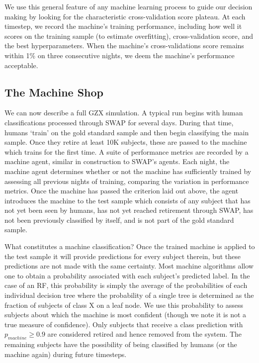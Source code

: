 \documentclass[twocolumn]{aastex6}
\begin{document}
We use this general feature of any machine learning process to guide our 
decision making by looking for the characteristic 
cross-validation score plateau. At each timestep, we record
the machine's training performance, including how well it scores on the 
training sample (to estimate overfitting), cross-validation score, 
and the best hyperparameters. When the machine's 
cross-validations score remains within 1\% on three consecutive nights, 
we deem the machine's performance acceptable. 


\subsection{The Machine Shop}\label{sec: machine shop}
We can now describe a full GZX simulation. A typical run begins with human classifications 
processed through SWAP for several days. During that time, humans `train' on the 
gold standard sample and then begin classifying the main sample.  Once they retire 
at least 10K subjects, these are passed to the machine which trains for the first time. 
A suite of performance metrics are recorded by a machine agent, similar
in construction to SWAP's agents. Each night, the machine agent determines 
whether or not the machine has sufficiently trained by assessing all previous nights of 
training, comparing the variation in performance metrics. Once the machine has
passed the criterion laid out above, the agent introduces the machine to the test sample
which consists of any subject that has not yet been seen by humans, has not yet 
reached retirement through SWAP, has not been previously classified by itself, 
and is not part of the gold standard sample.  

What constitutes a machine classification? Once the trained machine is applied to
the test sample it will provide predictions for every subject therein, but these predictions
are not made with the same certainty. Most machine algorithms allow one to obtain
a probability associated with each subject's predicted label. 
In the case of an RF, this probability is simply the average of the probabilities of each 
individual decision tree where the probability of a single tree is determined as the fraction
of subjects of class X on a leaf node.  We use this probability to assess subjects about which
the machine is most confident (though we note it is not a true measure of confidence).
Only subjects that receive a class prediction with $p_{machine} \ge 0.9$ are considered
retired and hence removed from the system. The remaining subjects have the possibility 
of being classified by humans (or the machine again) during future timesteps. 
\end{document}
